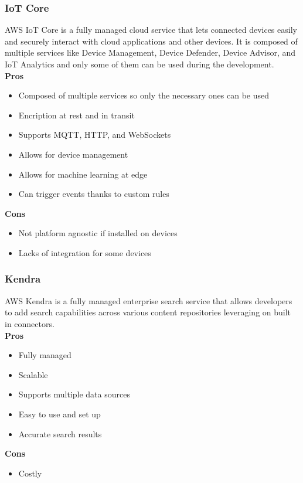         \subsubsection{IoT Core}
        \label{aws:iot-core}
        AWS IoT Core is a fully managed cloud service that lets connected devices easily and securely interact with cloud applications and other devices.
        It is composed of multiple services like Device Management, Device Defender, Device Advisor, and IoT Analytics and only some of them can be used during the development.\\
        \textbf{Pros}
        \begin{itemize}
            \item Composed of multiple services so only the necessary ones can be used
            \item Encription at rest and in transit
            \item Supports MQTT, HTTP, and WebSockets
            \item Allows for device management
            \item Allows for machine learning at edge
            \item Can trigger events thanks to custom rules
        \end{itemize}
        \textbf{Cons}
        \begin{itemize}
            \item Not platform agnostic if installed on devices
            \item Lacks of integration for some devices
        \end{itemize}       

        \subsubsection{Kendra}
        \label{aws:kendra}
        AWS Kendra is a fully managed enterprise search service that allows developers to add search capabilities across various content repositories leveraging on built in connectors.\\
        \textbf{Pros}
        \begin{itemize}
            \item Fully managed
            \item Scalable
            \item Supports multiple data sources
            \item Easy to use and set up
            \item Accurate search results
        \end{itemize}
        \textbf{Cons}
        \begin{itemize}
            \item Costly
        \end{itemize}

